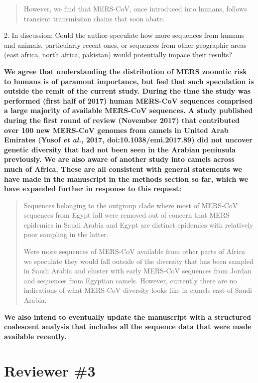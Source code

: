 \documentclass[11pt,oneside,letterpaper]{article}
\begin{document}
\begin{quotation}
However, we find that MERS-CoV, once introduced into humans, follows transient transmission chains that soon abate.
\end{quotation}

2. In discussion: Could the author speculate how more sequences from humans and animals, particularly recent ones, or sequences from other geographic areas (east africa, north africa, pakistan) would potentially impace their results?

\textbf{We agree that understanding the distribution of MERS zoonotic risk to humans is of paramout importance, but feel that such speculation is outside the remit of the current study.
During the time the study was performed (first half of 2017) human MERS-CoV sequences comprised a large majority of available MERS-CoV sequences.
A study published during the first round of review (November 2017) that contributed over 100 new MERS-CoV genomes from camels in United Arab Emirates (Yusof \textit{et al.}, 2017, doi:10.1038/emi.2017.89) did not uncover genetic diversity that had not been seen in the Arabian peninsula previously.
We are also aware of another study into camels across much of Africa.
These are all consistent with general statements we have made in the manuscript in the methods section so far, which we have expanded further in response to this request:}

\begin{quotation}
Sequences belonging to the outgroup clade where most of MERS-CoV sequences from Egypt fall were removed out of concern that MERS epidemics in Saudi Arabia and Egypt are distinct epidemics with relatively poor sampling in the latter.

Were more sequences of MERS-CoV available from other parts of Africa we speculate they would fall outside of the diversity that has been sampled in Saudi Arabia and cluster with early MERS-CoV sequences from Jordan and sequences from Egyptian camels.
However, currently there are no indications of what MERS-CoV diversity looks like in camels east of Saudi Arabia.
\end{quotation}

\textbf{We also intend to eventually update the manuscript with a structured coalescent analysis that includes all the sequence data that were made available recently.}

\section*{Reviewer \#3}
\end{document}
